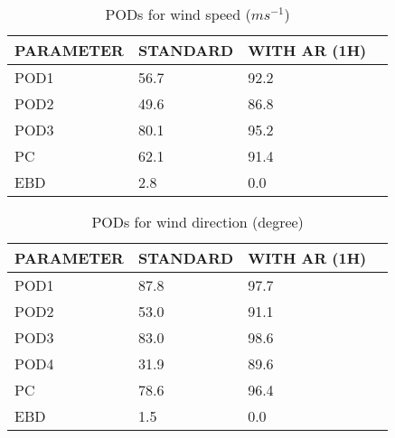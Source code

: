\documentclass[11pt,english]{article}
\begin{document}
\newpage

\clearpage
\begin{table}[]
\begin{center}
\begin{tabular}{|l|l|l|l|}
\hline
\multicolumn{1}{|c|}{\cellcolor[HTML]{C0C0C0}\textbf{PARAMETER}} & \multicolumn{1}{c|}{\cellcolor[HTML]{C0C0C0}\textbf{STANDARD}} & \multicolumn{1}{c|}{\cellcolor[HTML]{C0C0C0}\textbf{WITH AR (1H)}} \\
\hline
\cellcolor[HTML]{C0C0C0}POD1  & 56.7                                & 92.2         \\
\cellcolor[HTML]{C0C0C0}POD2  & 49.6                                & 86.8         \\
\cellcolor[HTML]{C0C0C0}POD3  & 80.1                                & 95.2         \\
\cellcolor[HTML]{C0C0C0}PC    & 62.1                                  & 91.4           \\
\cellcolor[HTML]{C0C0C0}EBD   & 2.8                                 & 0.0          \\
\hline
\end{tabular}
\caption{PODs for wind speed ($m s^{-1}$)}
\end{center}
\end{table}
\begin{table}[]
\begin{center}
\begin{tabular}{|l|l|l|l|}
\hline
\multicolumn{1}{|c|}{\cellcolor[HTML]{C0C0C0}\textbf{PARAMETER}} & \multicolumn{1}{c|}{\cellcolor[HTML]{C0C0C0}\textbf{STANDARD}} & \multicolumn{1}{c|}{\cellcolor[HTML]{C0C0C0}\textbf{WITH AR (1H)}} \\
\hline
\cellcolor[HTML]{C0C0C0}POD1  & 87.8      & 97.7     \\
\cellcolor[HTML]{C0C0C0}POD2  & 53.0      & 91.1     \\
\cellcolor[HTML]{C0C0C0}POD3  & 83.0      & 98.6     \\
\cellcolor[HTML]{C0C0C0}POD4  & 31.9      & 89.6     \\
\cellcolor[HTML]{C0C0C0}PC    & 78.6        & 96.4       \\
\cellcolor[HTML]{C0C0C0}EBD   & 1.5       & 0.0      \\
\hline
\end{tabular}
\caption{PODs for wind direction (degree)}
\end{center}
\end{table}
\end{document}

